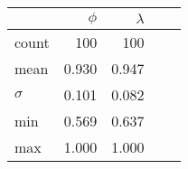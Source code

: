 \begin{tabular}{ l r r r r }
\toprule
         &  $\phi$   &  $\lambda$   \\
\midrule
count	 &    100 &   100  \\
mean     &  0.930 & 0.947  \\
$\sigma$ &  0.101 &  0.082 \\
min      &  0.569 & 0.637  \\
max      &  1.000 & 1.000  \\
\bottomrule
\end{tabular}
